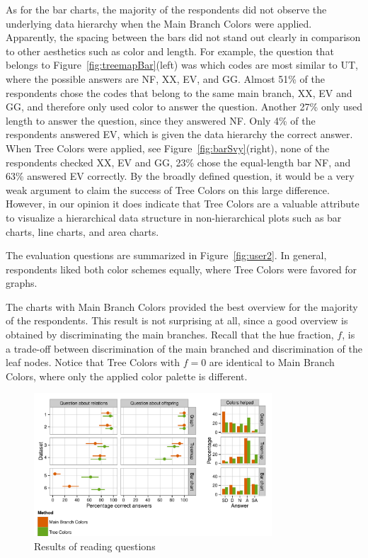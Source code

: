 \documentclass[journal]{vgtc}                %
\begin{document}
As for the bar charts, the majority of the respondents did not observe the underlying data hierarchy when the Main Branch Colors were applied. Apparently, the spacing between the bars did not stand out clearly in comparison to other aesthetics such as color and length. For example, the question that belongs to Figure~\ref{fig:treemapBar}(left) was which codes are most similar to UT, where the possible answers are NF, XX, EV, and GG. Almost 51\% of the respondents chose the codes that belong to the same main branch, XX, EV and GG, and therefore only used color to answer the question. Another 27\% only used length to answer the question, since they answered NF. Only 4\% of the respondents answered EV, which is given the data hierarchy the correct answer. When Tree Colors were applied, see Figure~\ref{fig:barSvy}(right), none of the respondents checked XX, EV and GG, 23\% chose the equal-length bar NF, and 63\% answered EV correctly. By the broadly defined question, it would be a very weak argument to claim the success of Tree Colors on this large difference. However, in our opinion it does indicate that Tree Colors are a valuable attribute to visualize a hierarchical data structure in non-hierarchical plots such as bar charts, line charts, and area charts.

The evaluation questions are summarized in Figure~\ref{fig:user2}. In general, respondents liked both color schemes equally, where Tree Colors were favored for graphs.

The charts with Main Branch Colors provided the best overview for the majority of the respondents. This result is not surprising at all, since a good overview is obtained by discriminating the main branches. 
Recall that the hue fraction, $f$, is a trade-off between discrimination of the main branched and discrimination of the leaf nodes. Notice that Tree Colors with $f=0$ are identical to Main Branch Colors, where only the applied color palette is different.

\begin{figure}[tb]
  \centering
	\includegraphics[width=3.5in]{user_study_results_mod2.pdf}
  \caption{Results of reading questions}\label{fig:user1}
\end{figure}
\end{document}

